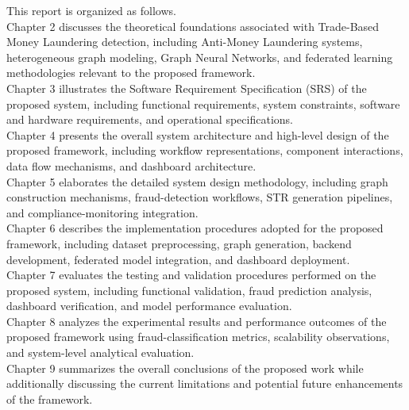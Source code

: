 This report is organized as follows.\\[0.8\baselineskip]
\hspace{1em}Chapter 2 discusses the theoretical foundations associated with Trade-Based Money Laundering detection, including Anti-Money Laundering systems, heterogeneous graph modeling, Graph Neural Networks, and federated learning methodologies relevant to the proposed framework.\\[0.8\baselineskip]
\hspace{1em}Chapter 3 illustrates the Software Requirement Specification (SRS) of the proposed system, including functional requirements, system constraints, software and hardware requirements, and operational specifications.\\[0.8\baselineskip]
\hspace{1em}Chapter 4 presents the overall system architecture and high-level design of the proposed framework, including workflow representations, component interactions, data flow mechanisms, and dashboard architecture.\\[0.8\baselineskip]
\hspace{1em}Chapter 5 elaborates the detailed system design methodology, including graph construction mechanisms, fraud-detection workflows, STR generation pipelines, and compliance-monitoring integration.\\[0.8\baselineskip]
\hspace{1em}Chapter 6 describes the implementation procedures adopted for the proposed framework, including dataset preprocessing, graph generation, backend development, federated model integration, and dashboard deployment.\\[0.8\baselineskip]
\hspace{1em}Chapter 7 evaluates the testing and validation procedures performed on the proposed system, including functional validation, fraud prediction analysis, dashboard verification, and model performance evaluation.\\[0.8\baselineskip]
\hspace{1em}Chapter 8 analyzes the experimental results and performance outcomes of the proposed framework using fraud-classification metrics, scalability observations, and system-level analytical evaluation.\\[0.8\baselineskip]
\hspace{1em}Chapter 9 summarizes the overall conclusions of the proposed work while additionally discussing the current limitations and potential future enhancements of the framework.




